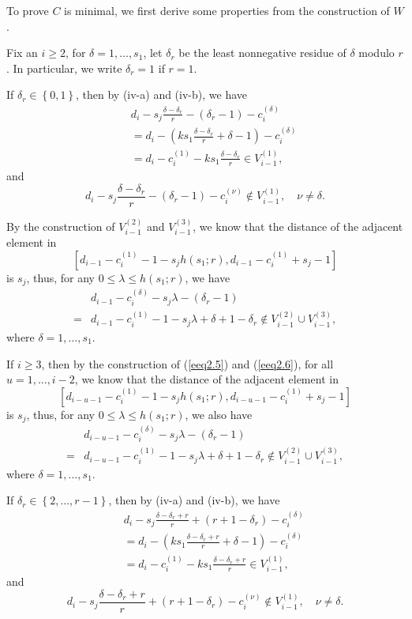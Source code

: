 \documentclass[12pt]{article}
\numberwithin{equation}{section}
\begin{document}
To prove $C$ is minimal, we first derive some properties from the construction of $W$.

Fix an $i\geqslant 2$, for $\delta=1,\dots,s_1$, let $\delta_r$ be the least nonnegative residue of $\delta$ modulo $r$. In particular, we write $\delta_r=1$ if $r=1$.

If $\delta_r\in \left\{0,1\right\}$, then by (iv-a) and (iv-b), we have
\begin{eqnarray*}
&&d_{i}-s_j\frac{\delta-\delta_r}{r}-(\delta_r-1)-c_{i}^{(\delta)}\\
&&=d_{i}-\left(ks_1\frac{\delta-\delta_r}{r}+\delta-1\right)-c_{i}^{(\delta)}\\
&&=d_{i}-c_{i}^{(1)}-ks_1\frac{\delta-\delta_r}{r}\in V_{i-1}^{(1)},
\end{eqnarray*}
and\begin{equation}\label{iv-e-1}d_{i}-s_j\frac{\delta-\delta_r}{r}-(\delta_r-1)-c_{i}^{(\nu)}\notin V_{i-1}^{(1)}, \quad \nu\neq \delta.\tag{iv-e-1}\end{equation}

By the construction of $V_{i-1}^{(2)}$ and $V_{i-1}^{(3)}$, we know that the distance of the adjacent element in $$ \left[d_{i-1}-c_{i}^{(1)}-1-s_jh(s_1;r), d_{i-1}-c_{i}^{(1)}+s_j-1\right]$$ is $s_j$,
thus, for any $0\leqslant \lambda \leqslant h(s_1;r)$, we have
\begin{align}&d_{i-1}-c_{i}^{(\delta)}-s_j\lambda-(\delta_r-1)\tag{iv-f-1}\\
=&d_{i-1}-c_{i}^{(1)}-1-s_j\lambda+\delta+1-\delta_r\notin V_{i-1}^{(2)}\cup V_{i-1}^{(3)},\nonumber
\end{align}
where $\delta=1,\ldots,s_1.$

If $i\geq 3$, then by the construction of (\ref{eeq2.5}) and (\ref{eeq2.6}), for all $u=1,\ldots, i-2$, we know that the distance of the adjacent element in$$\left[d_{i-u-1}-c_{i}^{(1)}-1-s_jh(s_1;r), d_{i-u-1}-c_{i}^{(1)}+s_j-1\right]$$
is $s_j$, thus, for any $0\leqslant \lambda \leqslant h(s_1;r)$, we also have
\begin{align}&d_{i-u-1}-c_{i}^{(\delta)}-s_j\lambda-(\delta_r-1)\tag{iv-g-1}\\
=&d_{i-u-1}-c_{i}^{(1)}-1-s_j\lambda+\delta+1-\delta_r\notin V_{i-1}^{(2)}\cup V_{i-1}^{(3)},\nonumber
\end{align}
where $\delta=1,\ldots,s_1.$

If $\delta_r\in \left\{2,\dots,r-1\right\}$, then by (iv-a) and (iv-b), we have
\begin{eqnarray*}
&&d_{i}-s_j\frac{\delta-\delta_r+r}{r}+(r+1-\delta_r)-c_{i}^{(\delta)}\\
&&=d_{i}-\left(ks_1\frac{\delta-\delta_r+r}{r}+\delta-1\right)-c_{i}^{(\delta)}\\
&&=d_{i}-c_{i}^{(1)}-ks_1\frac{\delta-\delta_r+r}{r}\in V_{i-1}^{(1)},
\end{eqnarray*}
and
\begin{equation}\label{iv-e-2}d_{i}-s_j\frac{\delta-\delta_r+r}{r}+(r+1-\delta_r)-c_{i}^{(\nu)}\notin V_{i-1}^{(1)}, \quad \nu\neq \delta.\tag{iv-e-2}\end{equation}
\end{document}

